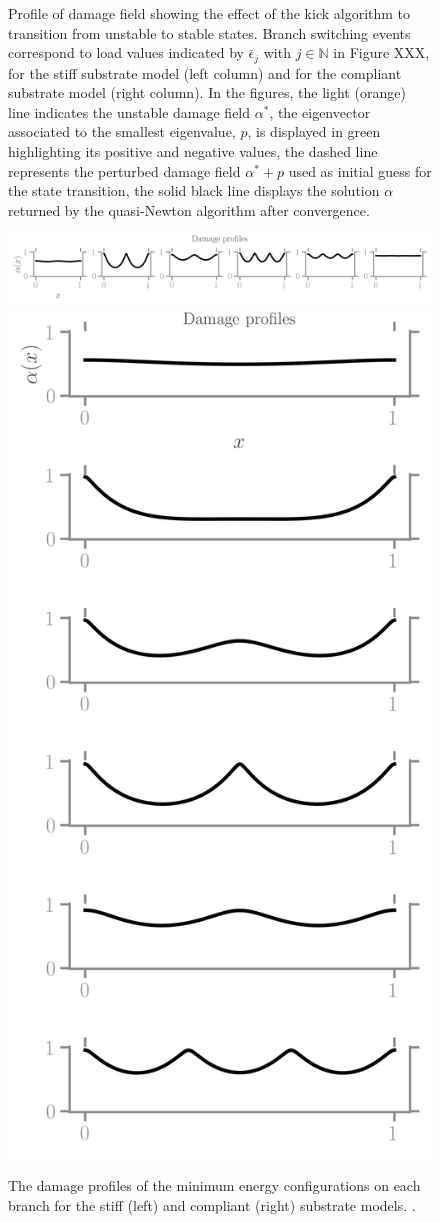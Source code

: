 \begin{figure}[htbp]
    \caption{
        Profile of damage field showing the effect of the kick algorithm to transition from unstable to stable states. Branch switching events correspond to load values indicated by $\bar \epsilon_j$ with $j\in \mathbb N$ in Figure XXX, for the stiff substrate model (left column) and for the compliant substrate model (right column). %
        In the figures, the light (orange) line indicates the unstable damage field $\alpha^*$, the eigenvector associated to the smallest eigenvalue, $p$, is displayed in green highlighting its positive and negative values, the dashed line represents the perturbed damage field  $\alpha^*+p$ used as initial guess for the state transition, the solid black line displays the solution $\alpha$ returned by the quasi-Newton algorithm after convergence.}
    \label{fig:}
\end{figure}
\begin{figure}[htbp]
    \centering
    \includegraphics*[width=.45\textwidth]{../images/model_stiff_profiles.png}
    \includegraphics*[width=.45\textwidth]{../images/model_compliant_profiles.png}
    \caption{The damage profiles of the minimum energy configurations on each branch for the stiff (left) and compliant (right) substrate models. .}
    \label{fig:}
\end{figure}
